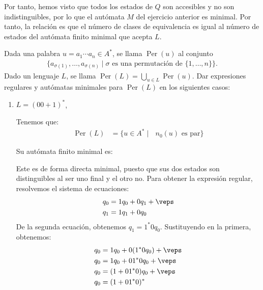 \begin{ejercicio}
\begin{enumerate}
        Por tanto, hemos visto que todos los estados de $Q$ son accesibles y no son indistinguibles, por lo que el autómata $M$ del ejercicio anterior es minimal. Por tanto, la relación es que el número de clases de equivalencia es igual al número de estados del autómata finito minimal que acepta $L$.
    \end{enumerate}
\end{ejercicio}

\begin{ejercicio}
    Dada una palabra $u = a_1 \cdots a_n \in A^*$, se llama $\operatorname{Per}(u)$ al conjunto
    \begin{align*}
        \{a_{\sigma(1)}, \ldots, a_{\sigma(n)} \mid \sigma \text{ es una permutación de } \{1, \ldots, n\}\}.
    \end{align*}
    Dado un lenguaje $L$, se llama $\operatorname{Per}(L) = \bigcup\limits_{u \in L} \operatorname{Per}(u)$.
    Dar expresiones regulares y autómatas minimales para $\operatorname{Per}(L)$ en los siguientes casos:
    \begin{enumerate}%
        \item $L = (00 + 1)^*$,
        
        Tenemos que:
        \begin{align*}
            \operatorname{Per}(L) &= \{u\in A^*\mid \text{ $n_0(u)$ es par}\}
        \end{align*}

        Su autómata finito minimal es:
        \begin{figure}[H]
            \centering
        \end{figure}
        
        Este es de forma directa minimal, puesto que sus dos estados son distinguibles al ser uno final y el otro no. Para obtener la expresión regular, resolvemos el sistema de ecuaciones:
        \begin{align*}
            q_0 &= 1q_0 + 0q_1 + \veps\\
            q_1 &= 1q_1 + 0q_0
        \end{align*}
        De la segunda ecuación, obtenemos $q_1=1^*0q_0$. Sustituyendo en la primera, obtenemos:
        \begin{align*}
            q_0 &= 1q_0 + 0(1^*0q_0) + \veps\\
            q_0 &= 1q_0 + 01^*0q_0 + \veps\\
            q_0 &= (1+01^*0)q_0 + \veps\\
            q_0 &= (1+01^*0)^*
        \end{align*}


\end{enumerate}
\end{ejercicio}
